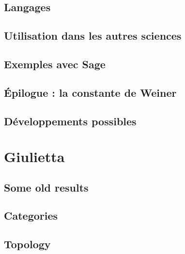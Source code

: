 \documentclass[a4paper,twoside,11pt]{book}
\begin{document}
\chapter{Langages}


\chapter{Utilisation dans les autres sciences}



\chapter{Exemples avec Sage}


\chapter{Épilogue : la constante de Weiner}



\chapter{Développements possibles}




\emptyInputPath
{}

\part{Giulietta}



\chapter{Some old results}


\chapter{Categories}        \label{chap_category}


\chapter{Topology}              \label{chap_topology}


\end{document}
